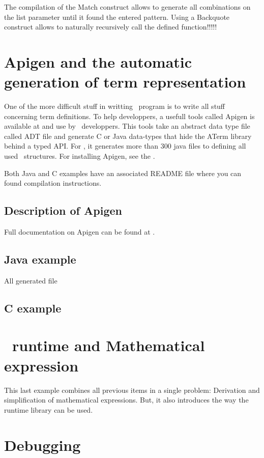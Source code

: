 The compilation of the Match construct allows to generate all
combinations on the list parameter until it found the entered pattern.
Using a Backquote construct allows to naturally recursively call the
defined function!!!!!

\section{Apigen and the automatic generation of term representation}
One of the more difficult stuff in writting \TOM\ program is to write
all stuff concerning term definitions. To help developpers, a usefull
tools called Apigen is available at  and use by \TOM\ developpers.
This tools take an abstract data type file called ADT file and
generate C or Java data-types that hide the ATerm library behind a
typed API.
For \TOM, it generates more than 300 java files to defining all used
\TOM\ structures.
For installing Apigen, see the .

Both Java and C examples have an associated README file where you can
found compilation instructions.

\subsection{Description of Apigen}
Full documentation on Apigen can be found at .
\subsection{Java example}
All generated file


\subsection{C example}


\section{\TOM\ runtime and Mathematical expression}
This last example combines all previous items in a single problem:
Derivation and simplification of mathematical expressions. But, it
also introduces the way the runtime library can be used.


\section{Debugging \TOM}
